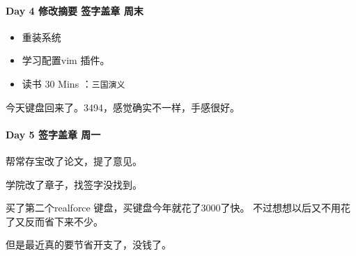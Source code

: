 \documentclass[UTF8,a4paper,8pt]{ctexart}
\begin{document}
 	 \paragraph{Day 4   修改摘要    签字盖章  周末 \quad     }
		 \begin{itemize}[itemindent = 1em]
		 	\renewcommand\labelitemi{\makebox[0pt][l]{$\square$}\raisebox{.15ex}{\hspace{0.1em}$\checkmark$}}		
		 	
		 	\item    重装系统
		 	
		 	
		 	\item    学习配置vim 插件。
		 	
		 	\renewcommand\labelitemi{\makebox[0pt][l]{$\square$}\hspace{1em}}
		 	\item   读书  30 Mins	：\verb|三国演义|
		 	
		 \end{itemize}
		 
		 今天键盘回来了。3494，感觉确实不一样，手感很好。
 	 \paragraph{Day 5   签字盖章    周一    \quad     }
	 	 帮常存宝改了论文，提了意见。
	 	 
	 	 学院改了章子，找签字没找到。	 	 
	 	 
	 	 买了第二个realforce  键盘，买键盘今年就花了3000了快。 不过想想以后又不用花了又反而省下来不少。
	 	 
	 	 但是最近真的要节省开支了，没钱了。
	 	 
\end{document}
